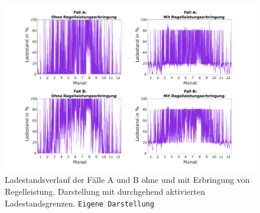 \begin{figure}[H]
	\begin{center}
		\includegraphics[width=\textwidth]{Bilder/Battery_SOC_extreme.pdf}
		\caption{Ladestandsverlauf der Fälle A und B ohne und mit Erbringung von Regelleistung. Darstellung mit durchgehend aktivierten Ladestandsgrenzen. \texttt{Eigene Darstellung}}
		\label{fig:soc}
	\end{center}
\end{figure}

